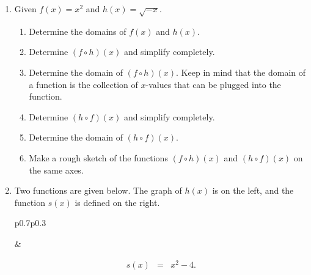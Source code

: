 \begin{enumerate}
\item Given $f(x)=x^2$ and $h(x)=\sqrt{-x}$.
\begin{enumerate}
\item Determine the domains of $f(x)$ and $h(x)$.
\item Determine $(f \circ h)(x)$ and simplify completely.
\item Determine the domain of $(f \circ h)(x)$.  Keep in mind that the
  domain of a function is the collection of $x$-values that can be
  plugged into the function.
\item  Determine $(h \circ f)(x)$ and simplify completely.
\item Determine the domain of $(h \circ f)(x)$.
\item Make a rough sketch of the functions $(f \circ h)(x)$ and
  $(h \circ f)(x)$ on the same axes.
\end{enumerate}

\item Two functions are given below. The graph of $h(x)$ is on
    the left, and the function $s(x)$ is defined on the right.
  
    \begin{tabular}{p{0.7\textwidth}p{0.3\textwidth}}
      \begin{minipage}{0.5\linewidth}
      \end{minipage}

      &
        \begin{minipage}{0.3\linewidth}
          \begin{eqnarray*}
            s(x) & = & x^2 - 4.
          \end{eqnarray*}
        \end{minipage}


\end{tabular}
\end{enumerate}
